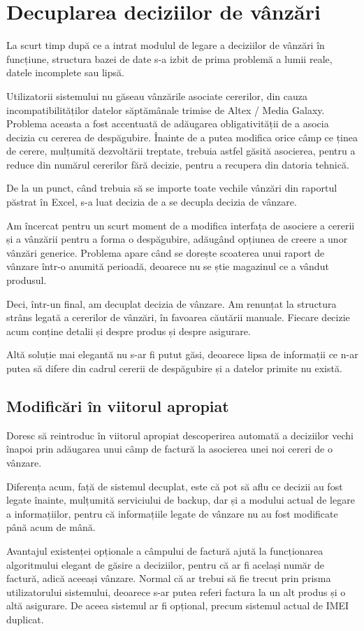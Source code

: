 \section{Decuplarea deciziilor de vânzări}

	La scurt timp după ce a intrat modulul de legare a deciziilor de vânzări în funcțiune, structura bazei de date s-a izbit de prima problemă a lumii reale, datele incomplete sau lipsă.

	Utilizatorii sistemului nu găseau vânzările asociate cererilor, din cauza incompatibilităților datelor săptămânale trimise de Altex / Media Galaxy.
	Problema aceasta a fost accentuată de adăugarea obligativității de a asocia decizia cu cererea de despăgubire.
	Înainte de a putea modifica orice câmp ce ținea de cerere, mulțumită dezvoltării treptate, trebuia astfel găsită asocierea, pentru a reduce din numărul cererilor fără decizie, pentru a recupera din datoria tehnică.

	De la un punct, când trebuia să se importe toate vechile vânzări din raportul păstrat în Excel, s-a luat decizia de a se decupla decizia de vânzare.

	Am încercat pentru un scurt moment de a modifica interfața de asociere a cererii și a vânzării pentru a forma o despăgubire, adăugând opțiunea de creere a unor vânzări generice.
	Problema apare când se dorește scoaterea unui raport de vânzare într-o anumită perioadă, deoarece nu se știe magazinul ce a vândut produsul.

	Deci, într-un final, am decuplat decizia de vânzare.
	Am renunțat la structura strâns legată a cererilor de vânzări, în favoarea căutării manuale.
	Fiecare decizie acum conține detalii și despre produs și despre asigurare.

	Altă soluție mai elegantă nu s-ar fi putut găsi, deoarece lipsa de informații ce n-ar putea să difere din cadrul cererii de despăgubire și a datelor primite nu există.

	\subsection{Modificări în viitorul apropiat}

	Doresc să reintroduc în viitorul apropiat descoperirea automată a deciziilor vechi înapoi prin adăugarea unui câmp de factură la asocierea unei noi cereri de o vânzare.

	Diferența acum, față de sistemul decuplat, este că pot să aflu ce decizii au fost legate înainte, mulțumită serviciului de backup, dar și a modului actual de legare a informațiilor, pentru că informațiile legate de vânzare nu au fost modificate până acum de mână.

	Avantajul existenței opționale a câmpului de factură ajută la funcționarea algoritmului elegant de găsire a deciziilor, pentru că ar fi același număr de factură, adică aceeași vânzare.
	Normal că ar trebui să fie trecut prin prisma utilizatorului sistemului, deoarece s-ar putea referi factura la un alt produs și o altă asigurare.
	De aceea sistemul ar fi opțional, precum sistemul actual de IMEI duplicat.

